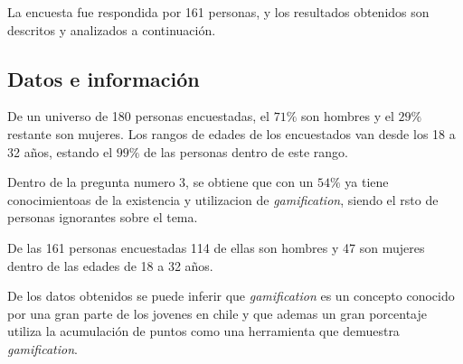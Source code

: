La encuesta fue respondida por 161 personas,
y los resultados obtenidos son descritos y analizados a continuación.

\subsection{Datos e información}

De un universo de 180 personas encuestadas, el $71\%$ son hombres y el $29\%$ restante son mujeres. 
Los rangos de edades de los encuestados van desde los 18 a 32 años, estando el $99\%$ de las personas
dentro de este rango.

Dentro de la pregunta numero 3, se obtiene que con un $54\%$ ya tiene conocimientoas de la existencia
y utilizacion de \emph{gamification}, siendo el rsto de personas ignorantes sobre el tema. 

De las 161 personas encuestadas 114 de ellas son hombres y 47 son mujeres dentro de las edades
de 18 a 32 años.


De los datos obtenidos se puede inferir que \emph{gamification} es un concepto conocido por una gran parte
de los jovenes en chile y que ademas un gran porcentaje utiliza la acumulación de puntos como una
herramienta que demuestra \emph{gamification}.
